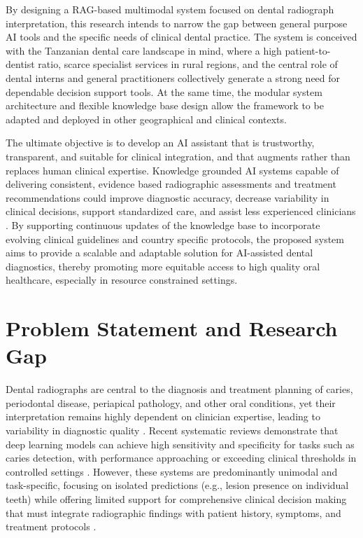 \documentclass[12pt,a4paper]{report}
\begin{document}
	By designing a RAG-based multimodal system focused on dental radiograph interpretation, this research intends to narrow the gap between general purpose AI tools and the specific needs of clinical dental practice. The system is conceived with the Tanzanian dental care landscape in mind, where a high patient-to-dentist ratio, scarce specialist services in rural regions, and the central role of dental interns and general practitioners collectively generate a strong need for dependable decision support tools. At the same time, the modular system architecture and flexible knowledge base design allow the framework to be adapted and deployed in other geographical and clinical contexts.
	
	The ultimate objective is to develop an AI assistant that is trustworthy, transparent, and suitable for clinical integration, and that augments rather than replaces human clinical expertise. Knowledge grounded AI systems capable of delivering consistent, evidence based radiographic assessments and treatment recommendations could improve diagnostic accuracy, decrease variability in clinical decisions, support standardized care, and assist less experienced clinicians \cite{White1996DecisionSupport}. By supporting continuous updates of the knowledge base to incorporate evolving clinical guidelines and country specific protocols, the proposed system aims to provide a scalable and adaptable solution for AI-assisted dental diagnostics, thereby promoting more equitable access to high quality oral healthcare, especially in resource constrained settings.
	
	
	\section{Problem Statement and Research Gap}
	
	Dental radiographs are central to the diagnosis and treatment planning of caries, periodontal disease, periapical pathology, and other oral conditions, yet their interpretation remains highly dependent on clinician expertise, leading to variability in diagnostic quality \cite{white_pharoah_radiology,White01121999}. Recent systematic reviews demonstrate that deep learning models can achieve high sensitivity and specificity for tasks such as caries detection, with performance approaching or exceeding clinical thresholds in controlled settings \cite{Dashti2024DLCariesUmbrella,Arzani2025AICariesUmbrella,MADANKUMAR20261}. However, these systems are predominantly unimodal and task-specific, focusing on isolated predictions (e.g., lesion presence on individual teeth) while offering limited support for comprehensive clinical decision making that must integrate radiographic findings with patient history, symptoms, and treatment protocols \cite{litjens2017survey,lee2019deep,schwendicke2020artificial}.
	
\end{document}
